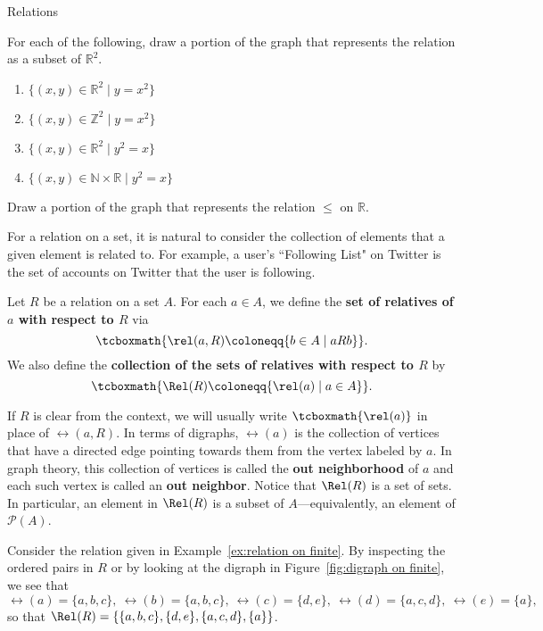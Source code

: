 \begin{section}{Relations}
\begin{problem}\label{prob:parabola}
For each of the following, draw a portion of the graph that represents the relation as a subset of $\mathbb{R}^2$.
\begin{enumerate}[label=\textrm{(\alph*)}]
\item $\{(x,y)\in \mathbb{R}^2 \mid y=x^2\}$
\item $\{(x,y)\in \mathbb{Z}^2 \mid y=x^2\}$
\item $\{(x,y)\in \mathbb{R}^2 \mid y^2=x\}$
\item $\{(x,y)\in \mathbb{N}\times \mathbb{R} \mid y^2=x\}$
\end{enumerate}
\end{problem}

\begin{problem}
Draw a portion of the graph that represents the relation $\leq$ on $\mathbb{R}$.
\end{problem}

For a relation on a set, it is natural to consider the collection of elements that a given element is related to.  For example, a user's ``Following List" on Twitter is the set of accounts on Twitter that the user is following. %

\begin{definition}\label{def:relatives}
Let $R$ be a relation on a set $A$. For each $a\in A$, we define the \textbf{set of relatives of $a$ with respect to $R$} via
\[
\tcboxmath{\rel(a,R)\coloneqq \{b\in A\mid aR b\}}.
\]
We also define the \textbf{collection of the sets of relatives with respect to $R$} by
\[
\tcboxmath{\Rel(R)\coloneqq \{\rel(a)\mid a\in A\}}.
\]
\end{definition}

If $R$ is clear from the context, we will usually write $\tcboxmath{\rel(a)}$ in place of $\rel(a,R)$.  In terms of digraphs, $\rel(a)$ is the collection of vertices that have a directed edge pointing towards them from the vertex labeled by $a$. In graph theory, this collection of vertices is called the \textbf{out neighborhood} of $a$ and each such vertex is called an \textbf{out neighbor}. Notice that $\Rel(R)$ is a set of sets.  In particular, an element in $\Rel(R)$ is a subset of $A$---equivalently, an element of $\mathcal{P}(A)$.

\begin{example}
Consider the relation given in Example~\ref{ex:relation on finite}.  By inspecting the ordered pairs in $R$ or by looking at the digraph in Figure~\ref{fig:digraph on finite}, we see that
\[
\rel(a) = \{a,b,c\},\ \rel(b) = \{a,b,c\},\ \rel(c) = \{d,e\},\ \rel(d) = \{a,c,d\},\ \rel(e) = \{a\},
\]
so that $\Rel(R) = \{\{a,b,c\},\{d,e\},\{a,c,d\},\{a\}\}$.
\end{example}


\end{section}
